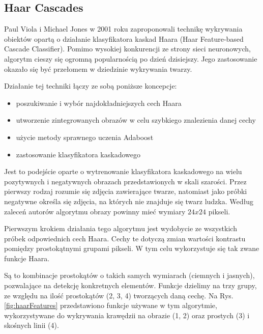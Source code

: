 \subsection{Haar Cascades}
Paul Viola i Michael Jones w 2001 roku zaproponowali technikę wykrywania obiektów opartą o działanie klasyfikatora kaskad Haara (Haar Feature-based Cascade Classifier). Pomimo wysokiej konkurencji ze strony sieci neuronowych, algorytm cieszy się ogromną popularnością po dzień dzisiejszy. \cite{haarCascade}Jego zastosowanie okazało się być przełomem w dziedzinie wykrywania twarzy. 

Działanie tej techniki \cite{haar} łączy ze sobą poniższe koncepcje:
\begin{itemize}
    \item poszukiwanie i wybór najdokładniejszych cech Haara
    \item utworzenie zintegrowanych obrazów w celu szybkiego znalezienia danej cechy
    \item użycie metody sprawnego uczenia Adaboost
    \item zastosowanie klasyfikatora kaskadowego%
\end{itemize}

Jest to podejście oparte o wytrenowanie klasyfikatora kaskadowego na wielu pozytywnych i negatywnych obrazach przedstawionych w skali szarości. Przez pierwszy rodzaj rozumie się zdjęcia zawierające twarze, natomiast jako próbki negatywne określa się zdjęcia, na których nie znajduje się twarz ludzka. Według zaleceń autorów algorytmu obrazy powinny mieć wymiary $24x24$ pikseli.

Pierwszym krokiem działania tego algorytmu jest wydobycie ze wszystkich próbek odpowiednich cech Haara. Cechy te dotyczą zmian wartości kontrastu pomiędzy prostokątnymi grupami pikseli. W tym celu wykorzystuje się tak zwane funkcje Haara.

Są to kombinacje prostokątów  o takich samych wymiarach (ciemnych i jasnych), pozwalające na detekcję konkretnych elementów. Funkcje dzielimy na trzy grupy, ze względu na ilość prostokątów (2, 3, 4) tworzących daną cechę. Na Rys. \ref{fig:haarFeatures} przedstawiono funkcje używane w tym algorytmie, wykorzystywane do wykrywania krawędzii na obrazie (1, 2) oraz prostych (3) i skośnych linii (4).

